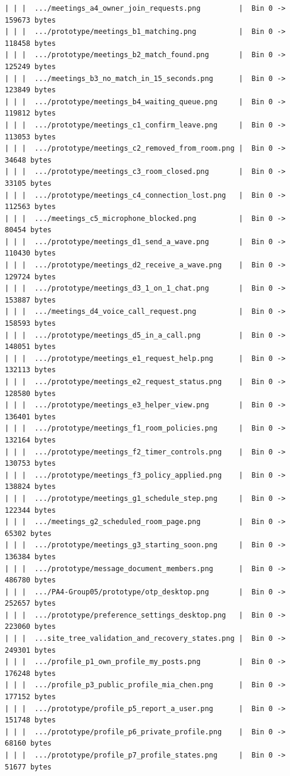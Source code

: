 \documentclass[12pt]{article}
\begin{document}
\begin{lstlisting}[numbers=none,breaklines=true]
| | |  .../meetings_a4_owner_join_requests.png         |  Bin 0 -> 159673 bytes
| | |  .../prototype/meetings_b1_matching.png          |  Bin 0 -> 118458 bytes
| | |  .../prototype/meetings_b2_match_found.png       |  Bin 0 -> 125249 bytes
| | |  .../meetings_b3_no_match_in_15_seconds.png      |  Bin 0 -> 123849 bytes
| | |  .../prototype/meetings_b4_waiting_queue.png     |  Bin 0 -> 119812 bytes
| | |  .../prototype/meetings_c1_confirm_leave.png     |  Bin 0 -> 113053 bytes
| | |  .../prototype/meetings_c2_removed_from_room.png |  Bin 0 -> 34648 bytes
| | |  .../prototype/meetings_c3_room_closed.png       |  Bin 0 -> 33105 bytes
| | |  .../prototype/meetings_c4_connection_lost.png   |  Bin 0 -> 112563 bytes
| | |  .../meetings_c5_microphone_blocked.png          |  Bin 0 -> 80454 bytes
| | |  .../prototype/meetings_d1_send_a_wave.png       |  Bin 0 -> 110430 bytes
| | |  .../prototype/meetings_d2_receive_a_wave.png    |  Bin 0 -> 129724 bytes
| | |  .../prototype/meetings_d3_1_on_1_chat.png       |  Bin 0 -> 153887 bytes
| | |  .../meetings_d4_voice_call_request.png          |  Bin 0 -> 158593 bytes
| | |  .../prototype/meetings_d5_in_a_call.png         |  Bin 0 -> 148051 bytes
| | |  .../prototype/meetings_e1_request_help.png      |  Bin 0 -> 132113 bytes
| | |  .../prototype/meetings_e2_request_status.png    |  Bin 0 -> 128580 bytes
| | |  .../prototype/meetings_e3_helper_view.png       |  Bin 0 -> 136401 bytes
| | |  .../prototype/meetings_f1_room_policies.png     |  Bin 0 -> 132164 bytes
| | |  .../prototype/meetings_f2_timer_controls.png    |  Bin 0 -> 130753 bytes
| | |  .../prototype/meetings_f3_policy_applied.png    |  Bin 0 -> 138824 bytes
| | |  .../prototype/meetings_g1_schedule_step.png     |  Bin 0 -> 122344 bytes
| | |  .../meetings_g2_scheduled_room_page.png         |  Bin 0 -> 65302 bytes
| | |  .../prototype/meetings_g3_starting_soon.png     |  Bin 0 -> 136384 bytes
| | |  .../prototype/message_document_members.png      |  Bin 0 -> 486780 bytes
| | |  .../PA4-Group05/prototype/otp_desktop.png       |  Bin 0 -> 252657 bytes
| | |  .../prototype/preference_settings_desktop.png   |  Bin 0 -> 223060 bytes
| | |  ...site_tree_validation_and_recovery_states.png |  Bin 0 -> 249301 bytes
| | |  .../profile_p1_own_profile_my_posts.png         |  Bin 0 -> 176248 bytes
| | |  .../profile_p3_public_profile_mia_chen.png      |  Bin 0 -> 177152 bytes
| | |  .../prototype/profile_p5_report_a_user.png      |  Bin 0 -> 151748 bytes
| | |  .../prototype/profile_p6_private_profile.png    |  Bin 0 -> 68160 bytes
| | |  .../prototype/profile_p7_profile_states.png     |  Bin 0 -> 51677 bytes

\end{lstlisting}
\end{document}
